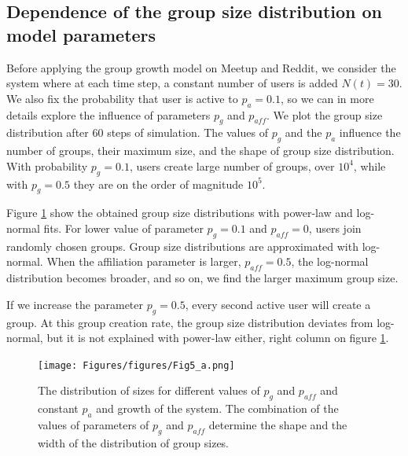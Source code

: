 \subsection{Dependence of the group size distribution on model parameters}

Before applying the group growth model on Meetup and Reddit, we consider the system where at each time step, a constant number of users is added $N(t)=30$. We also fix the probability that user is active to $p_a=0.1$, so we can in more details explore the influence of parameters $p_g$ and $p_{aff}$. We plot the group size distribution after $60$ steps of simulation. The values of $p_g$ and the $p_a$ influence the number of groups, their maximum size, and the shape of group size distribution. With probability $p_g=0.1$, users create large number of groups, over $10^4$, while with $p_g=0.5$ they are on the order of magnitude $10^5$. 

Figure \ref{fig:n30} show the obtained group size distributions with power-law and log-normal fits. For lower value of parameter $p_g=0.1$ and $p_{aff}=0$, users join randomly chosen groups. Group size distributions are approximated with log-normal. When the affiliation parameter is larger, $p_{aff}=0.5$, the log-normal distribution becomes broader, and so on, we find the larger maximum group size. 

If we increase the parameter $p_g=0.5$, every second active user will create a group. At this group creation rate, the group size distribution deviates from log-normal, but it is not explained with power-law either, right column on figure \ref{fig:n30}.

\begin{figure}[!ht]
	\centering
	\texttt{[image: Figures/figures/Fig5\_a.png]}
	\caption[Group size distribution for different model parameters]{The distribution of sizes for different values of $p_{g}$ and $p_{aff}$ and constant $p_{a}$ and growth of the system. The combination of the values of parameters of $p_{g}$ and $p_{aff}$ determine the shape and the width of the distribution of group sizes. }
	\label{fig:n30}
\end{figure}

